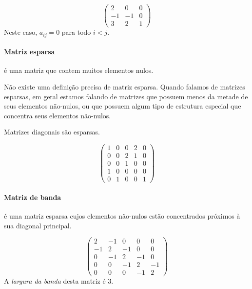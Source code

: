 \begin{exemplo}
    \begin{equation*}
        \begin{pmatrix}
            2 &  0 & 0\\
           -1 & -1 & 0\\
            3 &  2 & 1
        \end{pmatrix}
    \end{equation*}
    Neste caso, $a_{ij}=0$ para todo $i<j$.
\end{exemplo}

\paragraph*{Matriz esparsa} é uma matriz que contem muitos elementos nulos. 

Não existe uma definição precisa de matriz esparsa. Quando falamos de matrizes esparsas, em geral estamos falando de matrizes que possuem menos da metade de seus elementos não-nulos, ou que possuem algum tipo de estrutura especial que concentra seus elementos não-nulos.
\begin{exemplo}
    Matrizes diagonais são esparsas.
\end{exemplo}
\begin{exemplo}
    \begin{equation*}
        \begin{pmatrix}
            1 & 0 & 0 & 2 & 0\\
            0 & 0 & 2 & 1 & 0\\
            0 & 0 & 1 & 0 & 0\\
            1 & 0 & 0 & 0 & 0\\
            0 & 1 & 0 & 0 & 1
        \end{pmatrix}
    \end{equation*}
\end{exemplo}

\paragraph*{Matriz de banda} é uma matriz esparsa cujos elementos não-nulos estão concentrados próximos à sua diagonal principal.

\begin{exemplo}
    \begin{equation*}
        \begin{pmatrix}
            2 & -1 & 0 & 0 & 0\\
            -1 & 2 & -1 & 0 & 0\\
            0 & -1 & 2 & -1 & 0\\
            0 & 0 & -1 & 2 & -1\\
            0 & 0 & 0 & -1 & 2
        \end{pmatrix}
    \end{equation*}
    A \emph{largura da banda} desta matriz é 3.
\end{exemplo}

